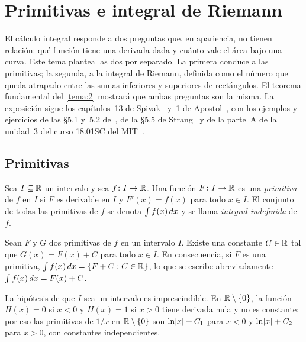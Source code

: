 \chapter{Primitivas e integral de Riemann}
\label{tema:1}

El cálculo integral responde a dos preguntas que, en apariencia, no tienen relación: qué función tiene una derivada dada y cuánto vale el área bajo una curva. Este tema plantea las dos por separado. La primera conduce a las primitivas; la segunda, a la integral de Riemann, definida como el número que queda atrapado entre las sumas inferiores y superiores de rectángulos. El teorema fundamental del \cref{tema:2} mostrará que ambas preguntas son la misma. La exposición sigue los capítulos~13 de Spivak~\cite{spivak} y~1 de Apostol~\cite{apostol}, con los ejemplos y ejercicios de las §5.1 y~5.2 de~\cite{openstax1}, de la §5.5 de Strang~\cite{strang} y de la parte~A de la unidad~3 del curso 18.01SC del MIT~\cite{mit1801}.

\section{Primitivas}

\begin{definicion}[Primitiva]\label{def:primitiva}
Sea $I\subseteq\mathbb{R}$ un intervalo y sea $f\colon I\to\mathbb{R}$. Una función $F\colon I\to\mathbb{R}$ es una \emph{primitiva} de $f$ en $I$ si $F$ es derivable en $I$ y $F'(x)=f(x)$ para todo $x\in I$. El conjunto de todas las primitivas de $f$ se denota $\int f(x)\mathop{}\!d x$ y se llama \emph{integral indefinida} de $f$.
\end{definicion}

\begin{proposicion}\label{prop:primitivas-constante}
Sean $F$ y $G$ dos primitivas de $f$ en un intervalo $I$. Existe una constante $C\in\mathbb{R}$ tal que $G(x)=F(x)+C$ para todo $x\in I$. En consecuencia, si $F$ es una primitiva, $\int f(x)\mathop{}\!d x=\{F+C: C\in\mathbb{R}\}$, lo que se escribe abreviadamente $\int f(x)\mathop{}\!d x=F(x)+C$.
\end{proposicion}

La hipótesis de que $I$ sea un intervalo es imprescindible. En $\mathbb{R}\setminus\{0\}$, la función $H(x)=0$ si $x<0$ y $H(x)=1$ si $x>0$ tiene derivada nula y no es constante; por eso las primitivas de $1/x$ en $\mathbb{R}\setminus\{0\}$ son $\ln\lvert x\rvert+C_1$ para $x<0$ y $\ln\lvert x\rvert+C_2$ para $x>0$, con constantes independientes.

